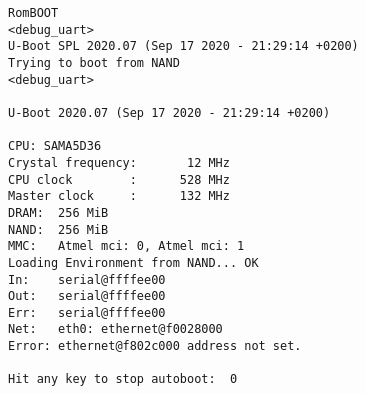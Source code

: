 \begin{verbatim}
RomBOOT
<debug_uart>
U-Boot SPL 2020.07 (Sep 17 2020 - 21:29:14 +0200)
Trying to boot from NAND
<debug_uart>

U-Boot 2020.07 (Sep 17 2020 - 21:29:14 +0200)

CPU: SAMA5D36
Crystal frequency:       12 MHz
CPU clock        :      528 MHz
Master clock     :      132 MHz
DRAM:  256 MiB
NAND:  256 MiB
MMC:   Atmel mci: 0, Atmel mci: 1
Loading Environment from NAND... OK
In:    serial@ffffee00
Out:   serial@ffffee00
Err:   serial@ffffee00
Net:   eth0: ethernet@f0028000
Error: ethernet@f802c000 address not set.

Hit any key to stop autoboot:  0
\end{verbatim}
